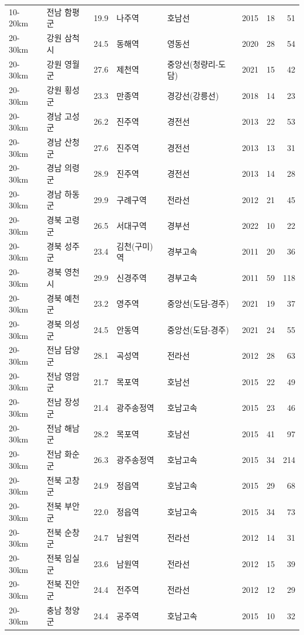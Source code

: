 \begin{tabular}{llrllrrr}
10-20km & 전남 함평군 & 19.9 & 나주역 & 호남선 & 2015 & 18 & 51\\
20-30km & 강원 삼척시 & 24.5 & 동해역 & 영동선 & 2020 & 28 & 54\\
20-30km & 강원 영월군 & 27.6 & 제천역 & 중앙선(청량리-도담) & 2021 & 15 & 42\\
20-30km & 강원 횡성군 & 23.3 & 만종역 & 경강선(강릉선) & 2018 & 14 & 23\\
20-30km & 경남 고성군 & 26.2 & 진주역 & 경전선 & 2013 & 22 & 53\\
20-30km & 경남 산청군 & 27.6 & 진주역 & 경전선 & 2013 & 13 & 31\\
20-30km & 경남 의령군 & 28.9 & 진주역 & 경전선 & 2013 & 14 & 28\\
20-30km & 경남 하동군 & 29.9 & 구례구역 & 전라선 & 2012 & 21 & 45\\
20-30km & 경북 고령군 & 26.5 & 서대구역 & 경부선 & 2022 & 10 & 22\\
20-30km & 경북 성주군 & 23.4 & 김천(구미)역 & 경부고속 & 2011 & 20 & 36\\
20-30km & 경북 영천시 & 29.9 & 신경주역 & 경부고속 & 2011 & 59 & 118\\
20-30km & 경북 예천군 & 23.2 & 영주역 & 중앙선(도담-경주) & 2021 & 19 & 37\\
20-30km & 경북 의성군 & 24.5 & 안동역 & 중앙선(도담-경주) & 2021 & 24 & 55\\
20-30km & 전남 담양군 & 28.1 & 곡성역 & 전라선 & 2012 & 28 & 63\\
20-30km & 전남 영암군 & 21.7 & 목포역 & 호남선 & 2015 & 22 & 49\\
20-30km & 전남 장성군 & 21.4 & 광주송정역 & 호남고속 & 2015 & 23 & 46\\
20-30km & 전남 해남군 & 28.2 & 목포역 & 호남선 & 2015 & 41 & 97\\
20-30km & 전남 화순군 & 26.3 & 광주송정역 & 호남고속 & 2015 & 34 & 214\\
20-30km & 전북 고창군 & 24.9 & 정읍역 & 호남고속 & 2015 & 29 & 68\\
20-30km & 전북 부안군 & 22.0 & 정읍역 & 호남고속 & 2015 & 34 & 73\\
20-30km & 전북 순창군 & 24.7 & 남원역 & 전라선 & 2012 & 14 & 31\\
20-30km & 전북 임실군 & 23.6 & 남원역 & 전라선 & 2012 & 15 & 39\\
20-30km & 전북 진안군 & 24.4 & 전주역 & 전라선 & 2012 & 12 & 29\\
20-30km & 충남 청양군 & 24.4 & 공주역 & 호남고속 & 2015 & 10 & 32\\

\end{tabular}
